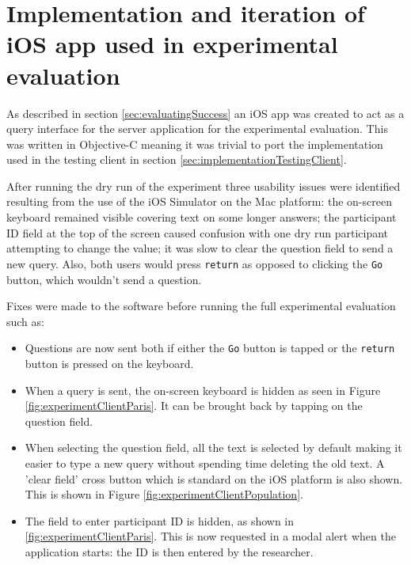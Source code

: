 \documentclass[authoryearcitations]{UoYCSproject}
\begin{document}
\section{Implementation and iteration of iOS app used in experimental evaluation}
\label{sec:implementationExperimentClient}
As described in section \ref{sec:evaluatingSuccess} an iOS app was created to act as a query interface for the server application for the experimental evaluation. This was written in Objective-C meaning it was trivial to port the implementation used in the testing client in section \ref{sec:implementationTestingClient}.

After running the dry run of the experiment three usability issues were identified resulting from the use of the iOS Simulator on the Mac platform: the on-screen keyboard remained visible covering text on some longer answers; the participant ID field at the top of the screen caused confusion with one dry run participant attempting to change the value; it was slow to clear the question field to send a new query. Also, both users would press \texttt{return} as opposed to clicking the \texttt{Go} button, which wouldn't send a question.

Fixes were made to the software before running the full experimental evaluation such as:
\begin{itemize}
  \item Questions are now sent both if either the \texttt{Go} button is tapped or the \texttt{return} button is pressed on the keyboard.
  \item When a query is sent, the on-screen keyboard is hidden as seen in Figure \ref{fig:experimentClientParis}. It can be brought back by tapping on the question field.
  \item When selecting the question field, all the text is selected by default making it easier to type a new query without spending time deleting the old text. A 'clear field' cross button which is standard on the iOS platform is also shown. This is shown in Figure \ref{fig:experimentClientPopulation}.
  \item The field to enter participant ID is hidden, as shown in \ref{fig:experimentClientParis}. This is now requested in a modal alert when the application starts: the ID is then entered by the researcher.
\end{itemize}
\end{document}
